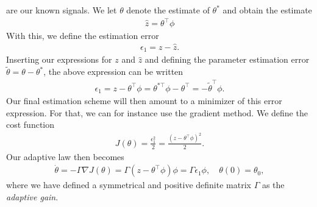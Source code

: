 \documentclass[]{article}
\begin{document}
are our known signals. We let $\theta$ denote the estimate of $\theta^*$ and obtain the estimate
\begin{equation}\begin{aligned}
\hat z = \theta^\top \phi
\end{aligned}\end{equation}
With this, we define the estimation error
\begin{equation}\begin{aligned}
\epsilon_1 = z - \hat z.
\end{aligned}\end{equation}
Inserting our expressions for $z$ and $\hat z$ and defining the parameter estimation error $\tilde \theta = \theta - \theta^*$, the above expression can be written
\begin{equation}\begin{aligned}
\epsilon_1 = z - \theta^\top \phi = \theta^{* \top} \phi - \theta^\top = -\tilde \theta^\top \phi.
\end{aligned}\end{equation}
Our final estimation scheme will then amount to a minimizer of this error expression. For that, we can for instance use the gradient method. We define the cost function
\begin{equation}\begin{aligned}
J(\theta) = \frac{\epsilon_1^2}{2} = \frac{(z - \theta^\top \phi)^2}{2}.
\end{aligned}\end{equation}
Our adaptive law then becomes
\begin{equation}\begin{aligned}
\dot \theta = -\Gamma \nabla J(\theta) = \Gamma(z - \theta^\top \phi)\phi = \Gamma \epsilon_1 \phi,
\quad \theta(0) = \theta_0,
\end{aligned}\end{equation}
where we have defined a symmetrical and positive definite matrix $\Gamma$ as the \textit{adaptive gain}.
\end{document}
